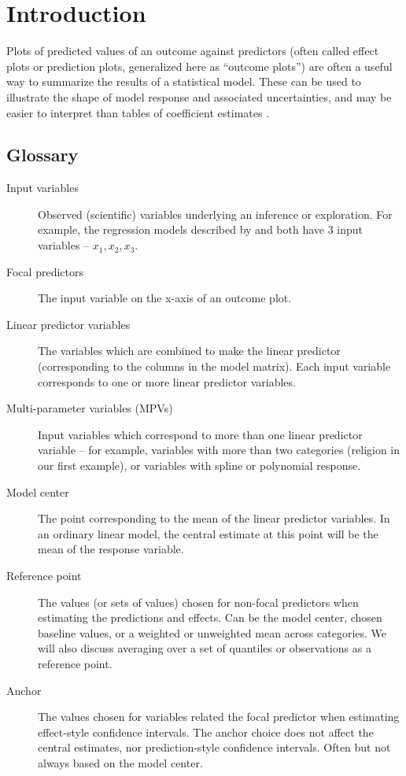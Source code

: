
\section{Introduction}

Plots of predicted values of an outcome against predictors (often called effect plots or prediction plots, generalized here as “outcome plots”) are often a useful way to summarize the results of a statistical model. These can be used to illustrate the shape of model response and associated uncertainties, and may be easier to interpret than tables of coefficient estimates \citep{brambor_understanding_2006, berry_improving_2012, leeper2017interpreting}. 

\begin{gloss}
\subsection*{Glossary}
\begin{description}
\item [Input variables] Observed (scientific) variables underlying an inference or exploration. For example, the regression models described by  and  both have $3$ input variables -- $x_1, x_2, x_3$.

\item [Focal predictors] The input variable on the x-axis of an outcome plot.

\item [Linear predictor variables] The variables which are combined to make the linear predictor (corresponding to the columns in the model matrix). Each input variable corresponds to one or more linear predictor variables.

\item[Multi-parameter variables (MPVs)] Input variables which correspond to more than one linear predictor variable -- for example, variables with more than two categories (religion in our first example), or variables with spline or polynomial response. 

\item [Model center] The point corresponding to the mean of the linear predictor variables. In an ordinary linear model, the central estimate at this point will be the mean of the response variable. 

\item [Reference point] The values (or sets of values) chosen for non-focal predictors when estimating the predictions and effects. Can be the model center, chosen baseline values, or a weighted or unweighted mean across categories. We will also discuss averaging over a set of quantiles or observations as a reference point.

\item [Anchor] The values chosen for variables related the focal predictor when estimating effect-style confidence intervals. The anchor choice does not affect the central estimates, nor prediction-style confidence intervals. Often but not always based on the model center. 

\end{description}
\end{gloss}

